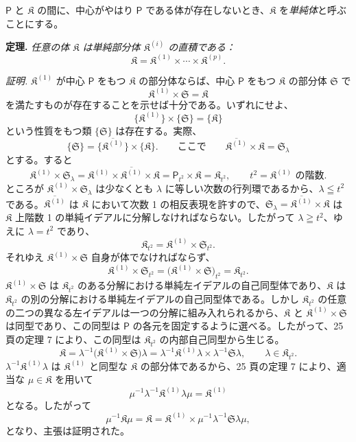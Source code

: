 \(\mathsf P\) と \(\mathfrak K\) の間に、中心がやはり \(\mathsf P\) である体が存在しないとき、\(\mathfrak K\) を\emph{単純体}と呼ぶことにする。

\textbf{定理.} \emph{任意の体 \(\mathfrak K\) は単純部分体 \(\mathfrak K^{(i)}\) の直積である：}
\[
\mathfrak K=\mathfrak K^{(1)}\times\cdots\times\mathfrak K^{(p)}.
\]

\emph{証明.} \(\mathfrak K^{(1)}\) が中心 \(\mathsf P\) をもつ \(\mathfrak K\) の部分体ならば、中心 \(\mathsf P\) をもつ \(\mathfrak K\) の部分体 \(\mathfrak S\) で
\[
\mathfrak K^{(1)}\times\mathfrak S=\mathfrak K
\]
を満たすものが存在することを示せば十分である。いずれにせよ、
\[
\{\mathfrak K^{(1)}\}\times\{\mathfrak S\}=\{\mathfrak K\}
\]
という性質をもつ類 \(\{\mathfrak S\}\) は存在する。実際、
\[
\{\mathfrak S\}=\{\overline{\mathfrak K^{(1)}}\}\times\{\mathfrak K\}.
\qquad
\text{ここで}\qquad
\overline{\mathfrak K^{(1)}}\times\mathfrak K=\mathfrak S_\lambda
\]
とする。すると
\[
\mathfrak K^{(1)}\times\mathfrak S_\lambda
=\mathfrak K^{(1)}\times\overline{\mathfrak K^{(1)}}\times\mathfrak K
=\mathsf P_{t^2}\times\mathfrak K
=\mathfrak K_{t^2},
\qquad
t^2=\mathfrak K^{(1)}\text{ の階数}.
\]
ところが \(\mathfrak K^{(1)}\times\mathfrak S_\lambda\) は少なくとも \(\lambda\) に等しい次数の行列環であるから、\(\lambda\leqq t^2\) である。\(\overline{\mathfrak K^{(1)}}\) は \(\mathfrak K\) において次数 1 の相反表現を許すので、\(\mathfrak S_\lambda=\overline{\mathfrak K^{(1)}}\times\mathfrak K\) は \(\mathfrak K\) 上階数 1 の単純イデアルに分解しなければならない。したがって \(\lambda\geqq t^2\)、ゆえに \(\lambda=t^2\) であり、
\[
\mathfrak K_{t^2}=\mathfrak K^{(1)}\times\mathfrak S_{t^2}.
\]
それゆえ \(\mathfrak K^{(1)}\times\mathfrak S\) 自身が体でなければならず、
\[
\mathfrak K^{(1)}\times\mathfrak S_{t^2}
=\bigl(\mathfrak K^{(1)}\times\mathfrak S\bigr)_{t^2}
=\mathfrak K_{t^2}.
\]
\(\mathfrak K^{(1)}\times\mathfrak S\) は \(\mathfrak K_{t^2}\) のある分解における単純左イデアルの自己同型体であり、\(\mathfrak K\) は \(\mathfrak K_{t^2}\) の別の分解における単純左イデアルの自己同型体である。しかし \(\mathfrak K_{t^2}\) の任意の二つの異なる左イデアルは一つの分解に組み入れられるから、\(\mathfrak K\) と \(\mathfrak K^{(1)}\times\mathfrak S\) は同型であり、この同型は \(\mathsf P\) の各元を固定するように選べる。したがって、25 頁の定理 7 により、この同型は \(\mathfrak K_{t^2}\) の内部自己同型から生じる。
\[
\mathfrak K
=\lambda^{-1}\bigl(\mathfrak K^{(1)}\times\mathfrak S\bigr)\lambda
=\lambda^{-1}\mathfrak K^{(1)}\lambda\times\lambda^{-1}\mathfrak S\lambda,
\qquad
\lambda\in\mathfrak K_{t^2}.
\]
\(\lambda^{-1}\mathfrak K^{(1)}\lambda\) は \(\mathfrak K^{(1)}\) と同型な \(\mathfrak K\) の部分体であるから、25 頁の定理 7 により、適当な \(\mu\in\mathfrak K\) を用いて
\[
\mu^{-1}\lambda^{-1}\mathfrak K^{(1)}\lambda\mu=\mathfrak K^{(1)}
\]
となる。したがって
\[
\mu^{-1}\mathfrak K\mu
=\mathfrak K
=\mathfrak K^{(1)}\times\mu^{-1}\lambda^{-1}\mathfrak S\lambda\mu,
\]
となり、主張は証明された。

